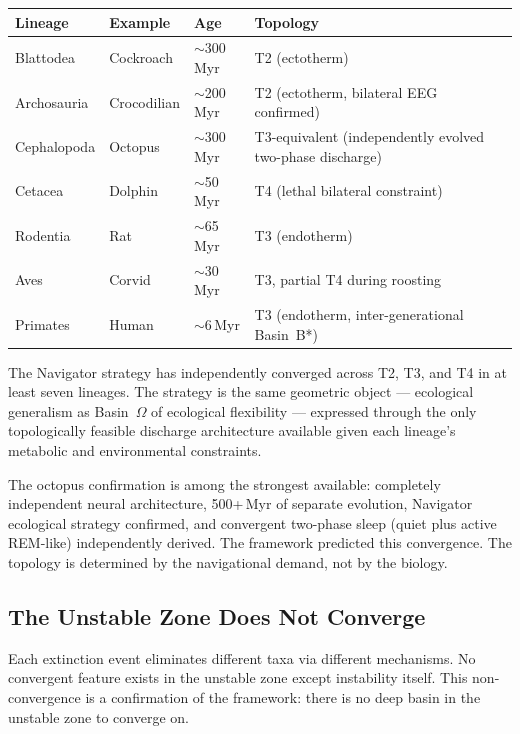 \documentclass[10pt, a4paper]{article}
\begin{document}
\begin{center}
\small
\begin{tabular}{p{3.0cm}p{2.5cm}p{2.0cm}p{4.0cm}}
\toprule
\textbf{Lineage} &
\textbf{Example} &
\textbf{Age} &
\textbf{Topology}\\
\midrule
Blattodea & Cockroach & $\sim$300\,Myr &
T2 (ectotherm)\\
Archosauria & Crocodilian & $\sim$200\,Myr &
T2 (ectotherm, bilateral EEG confirmed)\\
Cephalopoda & Octopus & $\sim$300\,Myr &
T3-equivalent (independently evolved
two-phase discharge)\\
Cetacea & Dolphin & $\sim$50\,Myr &
T4 (lethal bilateral constraint)\\
Rodentia & Rat & $\sim$65\,Myr &
T3 (endotherm)\\
Aves & Corvid & $\sim$30\,Myr &
T3, partial T4 during roosting\\
Primates & Human & $\sim$6\,Myr &
T3 (endotherm, inter-generational
Basin~B*)\\
\bottomrule
\end{tabular}
\end{center}

The Navigator strategy has independently
converged across T2, T3, and T4 in at
least seven lineages. The strategy is
the same geometric object --- ecological
generalism as Basin~$\Omega$ of ecological
flexibility --- expressed through the
only topologically feasible discharge
architecture available given each
lineage's metabolic and environmental
constraints.

The octopus confirmation is among the
strongest available: completely
independent neural architecture, 500+\,Myr
of separate evolution, Navigator ecological
strategy confirmed, and convergent
two-phase sleep (quiet plus active
REM-like) independently derived. The
framework predicted this convergence.
The topology is determined by the
navigational demand, not by the biology.

\subsection{The Unstable Zone Does Not
Converge}

Each extinction event eliminates different
taxa via different mechanisms. No convergent
feature exists in the unstable zone except
instability itself. This non-convergence
is a confirmation of the framework: there
is no deep basin in the unstable zone to
converge on.
\end{document}
